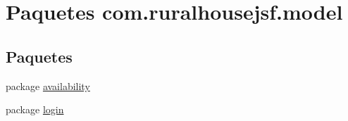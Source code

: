 \hypertarget{a00121}{}\section{Paquetes com.\+ruralhousejsf.\+model}
\label{a00121}
\subsection*{Paquetes}
\begin{DoxyCompactItemize}
\item 
package \mbox{\hyperlink{a00120}{availability}}
\item 
package \mbox{\hyperlink{a00122}{login}}
\end{DoxyCompactItemize}
